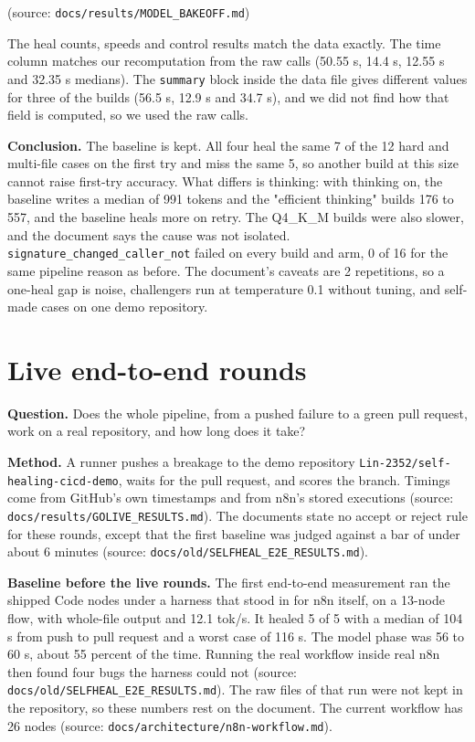 \documentclass[11pt,a4paper]{report}
\begin{document}
(source: \texttt{docs/\allowbreak{}results/\allowbreak{}MODEL\_\allowbreak{}BAKEOFF.\allowbreak{}md})

The heal counts, speeds and control results match the data exactly. The time column matches our recomputation from the raw calls (50.55 s, 14.4 s, 12.55 s and 32.35 s medians). The \texttt{summary} block inside the data file gives different values for three of the builds (56.5 s, 12.9 s and 34.7 s), and we did not find how that field is computed, so we used the raw calls.

\textbf{Conclusion.} The baseline is kept. All four heal the same 7 of the 12 hard and multi-file cases on the first try and miss the same 5, so another build at this size cannot raise first-try accuracy. What differs is thinking: with thinking on, the baseline writes a median of 991 tokens and the "efficient thinking" builds 176 to 557, and the baseline heals more on retry. The Q4\_K\_M builds were also slower, and the document says the cause was not isolated. \texttt{signature\_\allowbreak{}changed\_\allowbreak{}caller\_\allowbreak{}not} failed on every build and arm, 0 of 16 for the same pipeline reason as before. The document's caveats are 2 repetitions, so a one-heal gap is noise, challengers run at temperature 0.1 without tuning, and self-made cases on one demo repository.

\section{Live end-to-end rounds}

\textbf{Question.} Does the whole pipeline, from a pushed failure to a green pull request, work on a real repository, and how long does it take?

\textbf{Method.} A runner pushes a breakage to the demo repository \texttt{Lin-\allowbreak{}2352/\allowbreak{}self-\allowbreak{}healing-\allowbreak{}cicd-\allowbreak{}demo}, waits for the pull request, and scores the branch. Timings come from GitHub's own timestamps and from n8n's stored executions (source: \texttt{docs/\allowbreak{}results/\allowbreak{}GOLIVE\_\allowbreak{}RESULTS.\allowbreak{}md}). The documents state no accept or reject rule for these rounds, except that the first baseline was judged against a bar of under about 6 minutes (source: \texttt{docs/\allowbreak{}old/\allowbreak{}SELFHEAL\_\allowbreak{}E2E\_\allowbreak{}RESULTS.\allowbreak{}md}).

\textbf{Baseline before the live rounds.} The first end-to-end measurement ran the shipped Code nodes under a harness that stood in for n8n itself, on a 13-node flow, with whole-file output and 12.1 tok/s. It healed 5 of 5 with a median of 104 s from push to pull request and a worst case of 116 s. The model phase was 56 to 60 s, about 55 percent of the time. Running the real workflow inside real n8n then found four bugs the harness could not (source: \texttt{docs/\allowbreak{}old/\allowbreak{}SELFHEAL\_\allowbreak{}E2E\_\allowbreak{}RESULTS.\allowbreak{}md}). The raw files of that run were not kept in the repository, so these numbers rest on the document. The current workflow has 26 nodes (source: \texttt{docs/\allowbreak{}architecture/\allowbreak{}n8n-\allowbreak{}workflow.\allowbreak{}md}).
\end{document}
